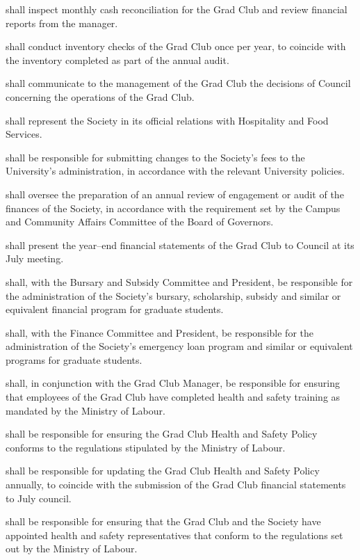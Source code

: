 \begin{longenum}[ label*=\thesubsection.\arabic*., align=left]
    \item shall inspect monthly cash reconciliation for the Grad Club and review financial reports from the manager.
    \item shall conduct inventory checks of the Grad Club once per year, to coincide with the inventory completed as part of the annual audit.
    \item shall communicate to the management of the Grad Club the decisions of Council concerning the operations of the Grad Club.
    \item shall represent the Society in its official relations with Hospitality and Food Services.
    \item shall be responsible for submitting changes to the Society's fees to the University's administration, in accordance with the relevant University policies.
    \item shall oversee the preparation of an annual review of engagement or audit of the finances of the Society, in accordance with the requirement set by the Campus and Community Affairs Committee of the Board of Governors.
    \item shall present the year--end financial statements of the Grad Club to Council at its July meeting. 
    \item shall, with the Bursary and Subsidy Committee and President, be responsible for the administration of the Society's bursary, scholarship, subsidy and similar or equivalent financial program for graduate students.
    \item shall, with the Finance Committee and President, be responsible for the administration of the Society's emergency loan program and similar or equivalent programs for graduate students.
    \item shall, in conjunction with the Grad Club Manager, be responsible for ensuring that employees of the Grad Club have completed health and safety training as mandated by the Ministry of Labour.
    \item shall be responsible for ensuring the Grad Club Health and Safety Policy conforms to the regulations stipulated by the Ministry of Labour.
    \item shall be responsible for updating the Grad Club Health and Safety Policy annually, to coincide with the submission of the Grad Club financial statements to July council.
    \item shall be responsible for ensuring that the Grad Club and the Society have appointed health and safety representatives that conform to the regulations set out by the Ministry of Labour.
    

\end{longenum}
